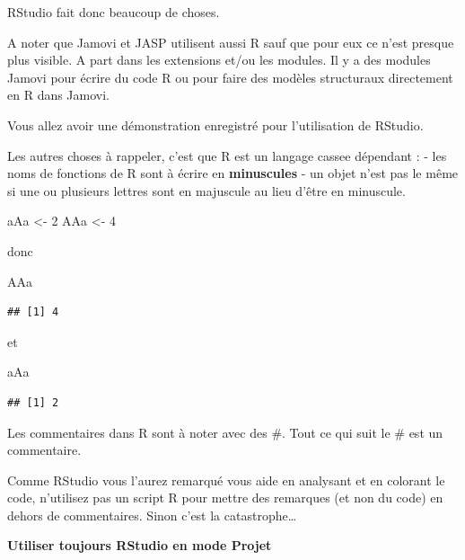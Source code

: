 \documentclass[
]{book}
\newenvironment{Shaded}{\begin{snugshade}}{\end{snugshade}}
\newcommand{\DecValTok}[1]{\textcolor[rgb]{0.00,0.00,0.81}{#1}}
\newcommand{\NormalTok}[1]{#1}
\newcommand{\OtherTok}[1]{\textcolor[rgb]{0.56,0.35,0.01}{#1}}
\begin{document}
RStudio fait donc beaucoup de choses.

A noter que Jamovi et JASP utilisent aussi R sauf que pour eux ce n'est presque
plus visible. A part dans les extensions et/ou les modules. Il y a des modules
Jamovi pour écrire du code R ou pour faire des modèles structuraux directement
en R dans Jamovi.

Vous allez avoir une démonstration enregistré pour l'utilisation de RStudio.

Les autres choses à rappeler, c'est que R est un langage cassee dépendant :
- les noms de fonctions de R sont à écrire en \textbf{minuscules}
- un objet n'est pas le même si une ou plusieurs lettres sont en majuscule au lieu
d'être en minuscule.

\begin{Shaded}
\begin{Highlighting}[]
\NormalTok{aAa }\OtherTok{\textless{}{-}} \DecValTok{2}
\NormalTok{AAa }\OtherTok{\textless{}{-}} \DecValTok{4}
\end{Highlighting}
\end{Shaded}

donc

\begin{Shaded}
\begin{Highlighting}[]
\NormalTok{AAa}
\end{Highlighting}
\end{Shaded}

\begin{verbatim}
## [1] 4
\end{verbatim}

et

\begin{Shaded}
\begin{Highlighting}[]
\NormalTok{aAa}
\end{Highlighting}
\end{Shaded}

\begin{verbatim}
## [1] 2
\end{verbatim}

Les commentaires dans R sont à noter avec des \#. Tout ce qui suit le \# est un
commentaire.

Comme RStudio vous l'aurez remarqué vous aide en analysant et en colorant le
code, n'utilisez pas un script R pour mettre des remarques (et non du code) en
dehors de commentaires. Sinon c'est la catastrophe\ldots{}

\textbf{Utiliser toujours RStudio en mode Projet}
\end{document}
